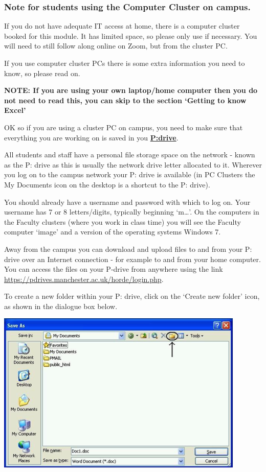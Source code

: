 \documentclass[
]{book}
\begin{document}
\hypertarget{note-for-students-using-the-computer-cluster-on-campus.}{%
\subsubsection{Note for students using the Computer Cluster on campus.}\label{note-for-students-using-the-computer-cluster-on-campus.}}

If you do not have adequate IT access at home, there is a computer cluster booked for this module. It has limited space, so please only use if necessary. You will need to still follow along online on Zoom, but from the cluster PC.

If you use computer cluster PCs there is some extra information you need to know, so please read on.

\textbf{NOTE: If you are using your own laptop/home computer then you do not need to read this, you can skip to the section `Getting to know Excel'}

OK so if you are using a cluster PC on campus, you need to make sure that everything you are working on is saved in you \href{https://www.library.manchester.ac.uk/using-the-library/staff/research/research-data-management/working/storage/}{\textbf{P:drive}}.

All students and staff have a personal file storage space on the network - known as the P: drive as this is usually the network drive letter allocated to it. Wherever you log on to the campus network your P: drive is available (in PC Clusters the My Documents icon on the desktop is a shortcut to the P: drive).

You should already have a username and password with which to log on. Your username has 7 or 8 letters/digits, typically beginning `m\ldots{}'. On the computers in the Faculty clusters (where you work in class time) you will see the Faculty computer `image' and a version of the operating systems Windows 7.

Away from the campus you can download and upload files to and from your P: drive over an Internet connection - for example to and from your home computer. You can access the files on your P-drive from anywhere using the link \url{https://pdrives.manchester.ac.uk/horde/login.php}.

To create a new folder within your P: drive, click on the `Create new folder' icon, as shown in the dialogue box below.

\includegraphics{imgs/create_folder.png}
\end{document}
